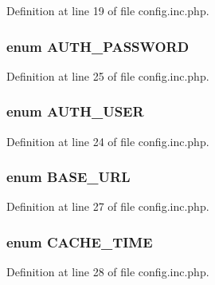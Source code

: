 Definition at line 19 of file config.inc.php.

\hypertarget{config_8inc_8php_adf2112da607b39714ba9cca31b42a93a}{
\subsubsection[{AUTH\_\-PASSWORD}]{\setlength{\rightskip}{0pt plus 5cm}enum {\bf AUTH\_\-PASSWORD}}}
\label{config_8inc_8php_adf2112da607b39714ba9cca31b42a93a}


Definition at line 25 of file config.inc.php.

\hypertarget{config_8inc_8php_a7d3a74ff015a9f789a5a2e554a9fa956}{
\subsubsection[{AUTH\_\-USER}]{\setlength{\rightskip}{0pt plus 5cm}enum {\bf AUTH\_\-USER}}}
\label{config_8inc_8php_a7d3a74ff015a9f789a5a2e554a9fa956}


Definition at line 24 of file config.inc.php.

\hypertarget{config_8inc_8php_a16548ab75ed30cbddce178d56d26dbb8}{
\subsubsection[{BASE\_\-URL}]{\setlength{\rightskip}{0pt plus 5cm}enum {\bf BASE\_\-URL}}}
\label{config_8inc_8php_a16548ab75ed30cbddce178d56d26dbb8}


Definition at line 27 of file config.inc.php.

\hypertarget{config_8inc_8php_afc454c0433a87811735836800fe3350b}{
\subsubsection[{CACHE\_\-TIME}]{\setlength{\rightskip}{0pt plus 5cm}enum {\bf CACHE\_\-TIME}}}
\label{config_8inc_8php_afc454c0433a87811735836800fe3350b}


Definition at line 28 of file config.inc.php.

